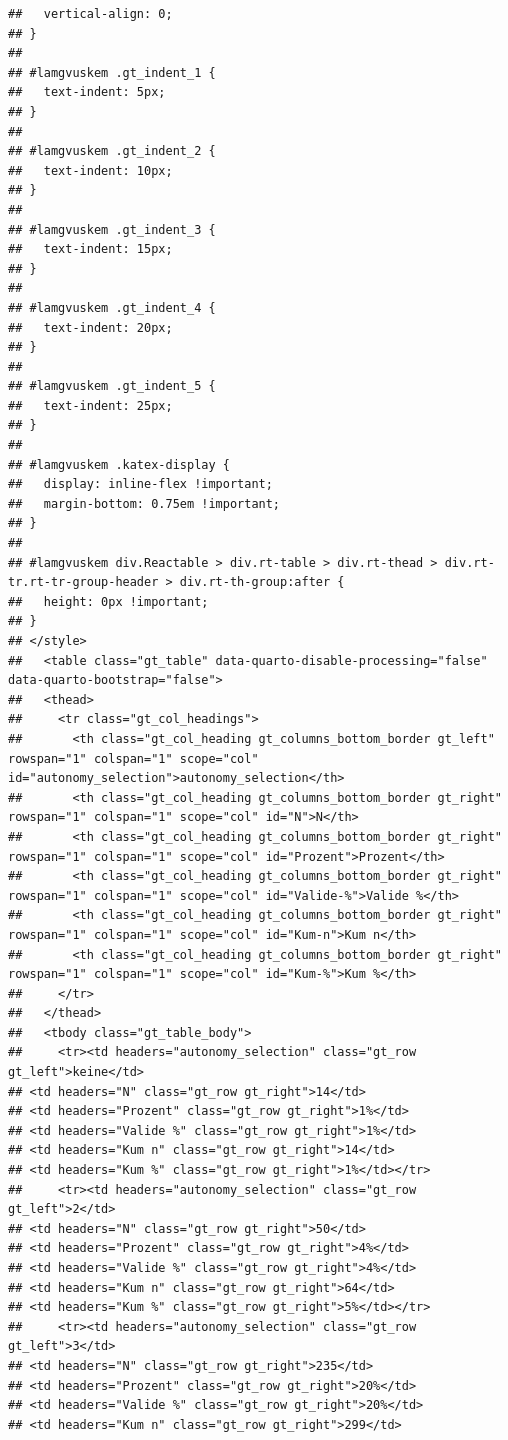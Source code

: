 \documentclass[
  a4paper,
  DIV=11,
  numbers=noendperiod]{scrartcl}
\begin{document}
\begin{verbatim}
##   vertical-align: 0;
## }
## 
## #lamgvuskem .gt_indent_1 {
##   text-indent: 5px;
## }
## 
## #lamgvuskem .gt_indent_2 {
##   text-indent: 10px;
## }
## 
## #lamgvuskem .gt_indent_3 {
##   text-indent: 15px;
## }
## 
## #lamgvuskem .gt_indent_4 {
##   text-indent: 20px;
## }
## 
## #lamgvuskem .gt_indent_5 {
##   text-indent: 25px;
## }
## 
## #lamgvuskem .katex-display {
##   display: inline-flex !important;
##   margin-bottom: 0.75em !important;
## }
## 
## #lamgvuskem div.Reactable > div.rt-table > div.rt-thead > div.rt-tr.rt-tr-group-header > div.rt-th-group:after {
##   height: 0px !important;
## }
## </style>
##   <table class="gt_table" data-quarto-disable-processing="false" data-quarto-bootstrap="false">
##   <thead>
##     <tr class="gt_col_headings">
##       <th class="gt_col_heading gt_columns_bottom_border gt_left" rowspan="1" colspan="1" scope="col" id="autonomy_selection">autonomy_selection</th>
##       <th class="gt_col_heading gt_columns_bottom_border gt_right" rowspan="1" colspan="1" scope="col" id="N">N</th>
##       <th class="gt_col_heading gt_columns_bottom_border gt_right" rowspan="1" colspan="1" scope="col" id="Prozent">Prozent</th>
##       <th class="gt_col_heading gt_columns_bottom_border gt_right" rowspan="1" colspan="1" scope="col" id="Valide-%">Valide %</th>
##       <th class="gt_col_heading gt_columns_bottom_border gt_right" rowspan="1" colspan="1" scope="col" id="Kum-n">Kum n</th>
##       <th class="gt_col_heading gt_columns_bottom_border gt_right" rowspan="1" colspan="1" scope="col" id="Kum-%">Kum %</th>
##     </tr>
##   </thead>
##   <tbody class="gt_table_body">
##     <tr><td headers="autonomy_selection" class="gt_row gt_left">keine</td>
## <td headers="N" class="gt_row gt_right">14</td>
## <td headers="Prozent" class="gt_row gt_right">1%</td>
## <td headers="Valide %" class="gt_row gt_right">1%</td>
## <td headers="Kum n" class="gt_row gt_right">14</td>
## <td headers="Kum %" class="gt_row gt_right">1%</td></tr>
##     <tr><td headers="autonomy_selection" class="gt_row gt_left">2</td>
## <td headers="N" class="gt_row gt_right">50</td>
## <td headers="Prozent" class="gt_row gt_right">4%</td>
## <td headers="Valide %" class="gt_row gt_right">4%</td>
## <td headers="Kum n" class="gt_row gt_right">64</td>
## <td headers="Kum %" class="gt_row gt_right">5%</td></tr>
##     <tr><td headers="autonomy_selection" class="gt_row gt_left">3</td>
## <td headers="N" class="gt_row gt_right">235</td>
## <td headers="Prozent" class="gt_row gt_right">20%</td>
## <td headers="Valide %" class="gt_row gt_right">20%</td>
## <td headers="Kum n" class="gt_row gt_right">299</td>

\end{verbatim}
\end{document}
